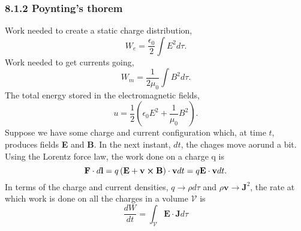 \documentclass[10pt,a4paper]{article}
\theoremstyle{break}
\begin{document}
      \subsubsection*{8.1.2 Poynting's thorem}
        Work needed to create a static charge distribution,
          \begin{equation*}
            W_e = \frac{\epsilon_0}{2}\int E^2 d\tau.
          \end{equation*}
        Work needed to get currents going,
          \begin{equation*}
            W_m = \frac{1}{2\mu_0}\int B^2 d\tau.
          \end{equation*}
        The total energy stored in the electromagnetic fields,
          \begin{equation}\tag{8.5}
            \boxed{u = \frac{1}{2}\left(\epsilon_0E^2 + \frac{1}{\mu_0}B^2\right).}
          \end{equation}
        Suppose we have some charge and current configuration which, at time $t$, produces fields \textbf{E} and \textbf{B}. In the next instant, $dt$, the chages move aorund a bit. Using the Lorentz force law, the work done on a charge q is
          \begin{equation*}
            \textbf{F} \cdot d\textbf{l} = q\left(\textbf{E} + \textbf{v}\cross\textbf{B}  \right)\cdot \textbf{v} dt = q\textbf{E}\cdot \textbf{v}dt.
          \end{equation*}
        In terms of the charge and current densities, $q \to \rho d\tau$ and $\rho\textbf{v}\to \textbf{J}^2$, the rate at which work is done on all the charges in a volume $\mathcal{V}$ is
          \[\frac{dW}{dt} = \int_{\mathcal{V}}\textbf{E}\cdot\textbf{J}d\tau  \]
\end{document}
